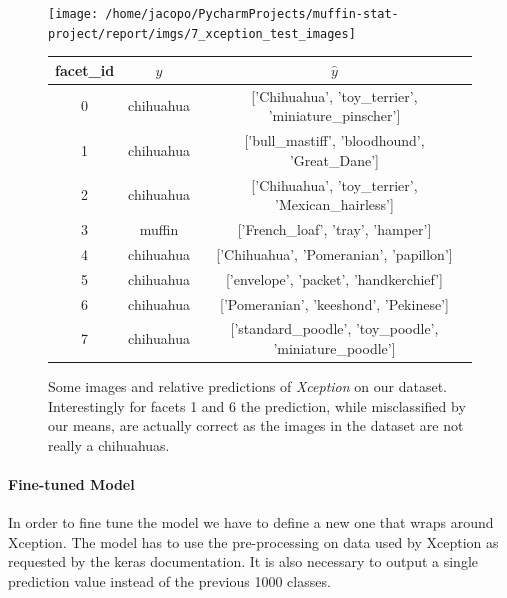 \begin{figure}
    \centering

    \texttt{[image: /home/jacopo/PycharmProjects/muffin-stat-project/report/imgs/7\_xception\_test\_images]}
    \begin{tabular}{ | c | c | c | }
        \hline
        facet\_id & $y$       & $\hat{y}$                                                \\
        \hline\hline
        0         & chihuahua & ['Chihuahua', 'toy\_terrier', 'miniature\_pinscher']     \\
        \hline
        1         & chihuahua & ['bull\_mastiff', 'bloodhound', 'Great\_Dane']           \\
        \hline
        2         & chihuahua & ['Chihuahua', 'toy\_terrier', 'Mexican\_hairless']       \\
        \hline
        3         & muffin    & ['French\_loaf', 'tray', 'hamper']                       \\
        \hline
        4         & chihuahua & ['Chihuahua', 'Pomeranian', 'papillon']                  \\
        \hline
        5         & chihuahua & ['envelope', 'packet', 'handkerchief']                   \\
        \hline
        6         & chihuahua & ['Pomeranian', 'keeshond', 'Pekinese']                   \\
        \hline
        7         & chihuahua & ['standard\_poodle', 'toy\_poodle', 'miniature\_poodle'] \\
        \hline
    \end{tabular}


    \caption{Some images and relative predictions of \textit{Xception} on our dataset.\\
    Interestingly for facets 1 and 6 the prediction, while misclassified by our means, are actually correct
    as the images in the dataset are not really a chihuahuas.
    }
    \label{fig:7_xception_test}
\end{figure}



\paragraph{Fine-tuned Model}
In order to fine tune the model we have to define a new one that wraps around Xception.
The model has to use the pre-processing on data used by Xception as requested by the keras documentation.
It is also necessary to output a single prediction value instead of the previous 1000 classes.

